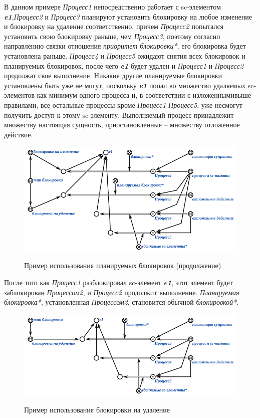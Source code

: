 В данном примере \textit{Процесс1} непосредственно работает с sc-элементом \textit{\textbf{e1}},\textit{Процесс2} и \textit{Процесс3} планируют установить блокировку на любое изменение и блокировку на удаление соответственно, причем \textit{Процесс2} попытался установить свою блокировку раньше, чем \textit{Процесс3}, поэтому согласно направлению связки отношения \textit{приоритет блокировки*}, его блокировка будет установлена раньше. \textit{Процесс4} и \textit{Процесс5} ожидают снятия всех блокировок и планируемых блокировок, после чего \textit{\textbf{e1}} будет удален и \textit{Процесс1} и \textit{Процесс2} продолжат свое выполнение. Никакие другие планируемые блокировки установлены быть уже не могут, поскольку \textit{\textbf{e1}} попал во множество удаляемых sc-элементов как минимум одного процесса и, в соответствии с изложеннымивыше правилами, все остальные процессы кроме \textit{Процесс1}-\textit{Процесс5}, уже несмогут получить доступ к этому sc-элементу.		
Выполняемый процесс принадлежит множеству настоящая сущность, приостановленные -- множеству отложенное действие.

\begin{figure}[h]
	\centering
	\caption{Пример использования планируемых блокировок (продолжение)}
	\includegraphics[scale=0.8]{images/part3/chapter_situation_management/plan_lock_2.png}
	\label{fig:plan_lock_2}
\end{figure}

После того как \textit{Процесс1} разблокировал sc-элемент \textit{\textbf{e1}}, этот элемент будет заблокирован \textit{Процессом2}, и \textit{Процесс2} продолжит выполнение. \textit{Планируемая блокировка*}, установленная \textit{Процессом2}, становится обычной \textit{блокировкой*}.

\begin{figure}[h]
	\centering
	\caption{Пример использования блокировки на удаление}
	\includegraphics[scale=0.8]{images/part3/chapter_situation_management/plan_lock_3.png}
	\label{fig:plan_lock_3}
\end{figure}

